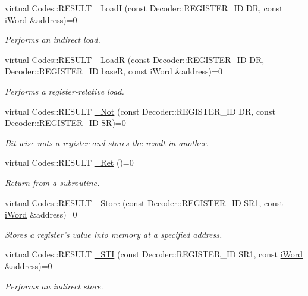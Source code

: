 \begin{DoxyCompactItemize}
virtual Codes::RESULT \hyperlink{classiWi11_ab8f6fc32bfc363f9798c795320c00894}{\_\-LoadI} (const Decoder::REGISTER\_\-ID DR, const \hyperlink{classiWord}{iWord} \&address)=0
\begin{DoxyCompactList}\small\item\em Performs an indirect load. \item\end{DoxyCompactList}\item 
virtual Codes::RESULT \hyperlink{classiWi11_a47fd64cc3629f9239c75fa4fea753c41}{\_\-LoadR} (const Decoder::REGISTER\_\-ID DR, Decoder::REGISTER\_\-ID baseR, const \hyperlink{classiWord}{iWord} \&address)=0
\begin{DoxyCompactList}\small\item\em Performs a register-\/relative load. \item\end{DoxyCompactList}\item 
virtual Codes::RESULT \hyperlink{classiWi11_a942ecd7956af6ad9c65c976b968d7832}{\_\-Not} (const Decoder::REGISTER\_\-ID DR, const Decoder::REGISTER\_\-ID SR)=0
\begin{DoxyCompactList}\small\item\em Bit-\/wise nots a register and stores the result in another. \item\end{DoxyCompactList}\item 
virtual Codes::RESULT \hyperlink{classiWi11_ae6c1048642dbf2c03c60062f6aaabfd2}{\_\-Ret} ()=0
\begin{DoxyCompactList}\small\item\em Return from a subroutine. \item\end{DoxyCompactList}\item 
virtual Codes::RESULT \hyperlink{classiWi11_a52659070aca67bf8fba76f059bc120aa}{\_\-Store} (const Decoder::REGISTER\_\-ID SR1, const \hyperlink{classiWord}{iWord} \&address)=0
\begin{DoxyCompactList}\small\item\em Stores a register's value into memory at a specified address. \item\end{DoxyCompactList}\item 
virtual Codes::RESULT \hyperlink{classiWi11_a3a299e4526c8c9865f529cc10e293a0c}{\_\-STI} (const Decoder::REGISTER\_\-ID SR1, const \hyperlink{classiWord}{iWord} \&address)=0
\begin{DoxyCompactList}\small\item\em Performs an indirect store. \item\end{DoxyCompactList}\item 

\end{DoxyCompactItemize}
